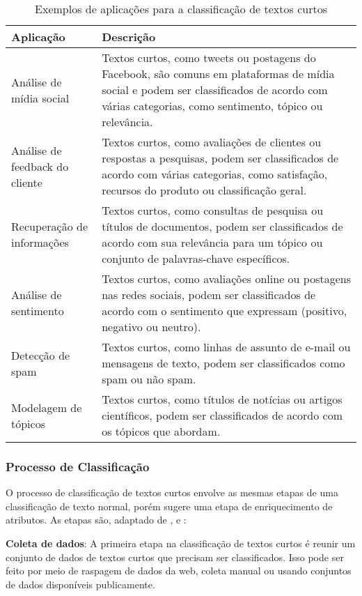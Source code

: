 \begin{table}[h]
\centering
\caption{Exemplos de aplicações para a classificação de textos curtos}
\label{tab:exemplos}
\begin{tabular}{p{6cm}|p{8cm}}
\hline
\textbf{Aplicação} & \textbf{Descrição} \\
\hline
Análise de mídia social & Textos curtos, como tweets ou postagens do Facebook, são comuns em plataformas de mídia social e podem ser classificados de acordo com várias categorias, como sentimento, tópico ou relevância.\\
\hline
Análise de feedback do cliente & Textos curtos, como avaliações de clientes ou respostas a pesquisas, podem ser classificados de acordo com várias categorias, como satisfação, recursos do produto ou classificação geral.\\
\hline
Recuperação de informações & Textos curtos, como consultas de pesquisa ou títulos de documentos, podem ser classificados de acordo com sua relevância para um tópico ou conjunto de palavras-chave específicos.\\
\hline
Análise de sentimento & Textos curtos, como avaliações online ou postagens nas redes sociais, podem ser classificados de acordo com o sentimento que expressam (positivo, negativo ou neutro).\\
\hline
Detecção de spam & Textos curtos, como linhas de assunto de e-mail ou mensagens de texto, podem ser classificados como spam ou não spam.\\
\hline
Modelagem de tópicos & Textos curtos, como títulos de notícias ou artigos científicos, podem ser classificados de acordo com os tópicos que abordam.\\
\hline
\end{tabular}
\end{table}

\subsubsection{Processo de Classificação}

O processo de classificação de textos curtos envolve as mesmas etapas de uma classificação de texto normal, porém \cite{song2014short} sugere uma etapa de enriquecimento de atributos.  As etapas são, adaptado de \cite{kowsari2019text}, \cite{alsmadi2019review} e \cite{aggarwal2018review}:

\textbf{Coleta de dados}: A primeira etapa na classificação de textos curtos é reunir um conjunto de dados de textos curtos que precisam ser classificados. Isso pode ser feito por meio de raspagem de dados da web, coleta manual ou usando conjuntos de dados disponíveis publicamente.

